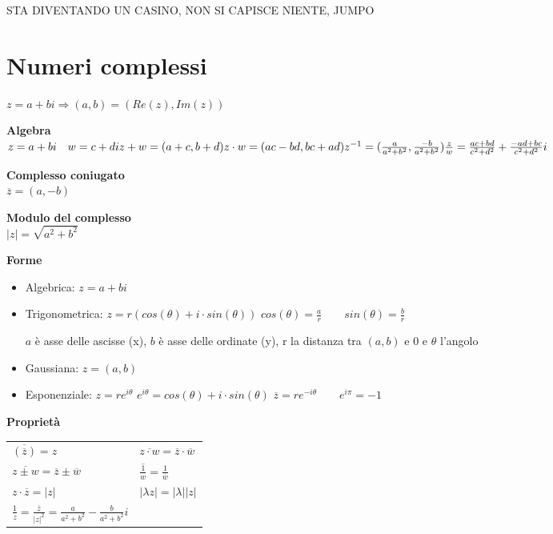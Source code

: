 \documentclass[12pt, a4paper]{article}
\begin{document}
STA DIVENTANDO UN CASINO, NON SI CAPISCE NIENTE, JUMPO

\newpage
\section{Numeri complessi}
$z=a+bi\Rightarrow(a,b)=(Re(z),Im(z))$

\textbf{Algebra}\\$z=a+bi\quad w=c+di\\z+w=(a+c,b+d)\\z\cdot w=(ac-bd,bc+ad)\\z^{-1}=(\frac{a}{a^{2}+b^{2}},
\frac{-b}{a^{2}+b^{2}})\\\frac{z}{w}=\frac{ac+bd}{c^2+d^2}+\frac{-ad+bc}{c^2+d^2}i$

\textbf{Complesso coniugato}\\$\overline{z}=(a,-b)$

\textbf{Modulo del complesso}\\$|z|=\sqrt{a^2+b^2}$

\textbf{Forme}
\begin{itemize}
    \item Algebrica: $z=a+bi$
    \item Trigonometrica: $z=r(cos(\theta)+i\cdot sin(\theta))$
    \subitem $cos(\theta)=\frac{a}{r}\qquad sin(\theta)=\frac{b}{r}$
    
    $a$ è asse delle ascisse (x), $b$ è asse delle ordinate (y), r la distanza tra $(a,b)$ e 0 e 
    $\theta$ l'angolo
    
    \item Gaussiana: $z=(a,b)$
    \item Esponenziale: $z=re^{i\theta}$
    \subitem $e^{i\theta}=cos(\theta)+i\cdot sin(\theta)$
    \subitem $\overline{z}=re^{-i\theta}\qquad e^{i\pi}=-1$
\end{itemize}

\textbf{Proprietà}
\begin{center}
\begin{tabular}{l l}
    $\overline{(\overline{z})}=z$ & $\overline{z\cdot w}=\overline{z}\cdot\overline{w}$\\
    $\overline{z\pm w}=\overline{z}\pm\overline{w}$ & $\overline{\frac{1}{w}}=\frac{1}{\overline{w}}$\\
    $z\cdot\overline{z}=|z|$ & $|\lambda z|=|\lambda||z|$\\
    $\frac{1}{z}=\frac{\overline{z}}{|z|^{2}}=\frac{a}{a^{2}+b^{2}}-\frac{b}{a^{2}+b^{2}}i$
    
\end{tabular}
\end{center}
\end{document}
